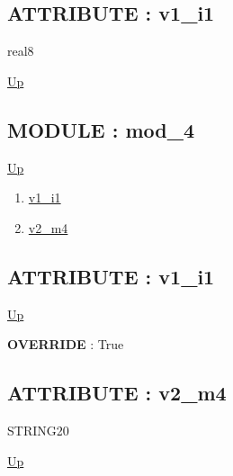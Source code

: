 \subsection*{ATTRIBUTE : v1\_i1}
\hypertarget{ecldoc:intest.example_2.iface_1.v1_i1}{}
\par
\begin{minipage}[t]{\textwidth}
\begin{flushleft}
real8  
\end{flushleft}
\end{minipage}
\hyperlink{ecldoc:intest.example_2.iface_1}{Up} \\
\par
\par

\subsection*{MODULE : mod\_4}
\hypertarget{ecldoc:intest.example_2.mod_4}{}
\par
\begin{minipage}[t]{\textwidth}
\begin{flushleft}
  
\end{flushleft}
\end{minipage}
\hyperlink{ecldoc:intest.example_2}{Up} \\
\par
\par
\begin{enumerate}
\item \hyperlink{ecldoc:intest.example_2.mod_4.v1_i1}{v1\_i1}
\item \hyperlink{ecldoc:intest.example_2.mod_4.v2_m4}{v2\_m4}
\end{enumerate}
\subsection*{ATTRIBUTE : v1\_i1}
\hypertarget{ecldoc:intest.example_2.mod_4.v1_i1}{}
\par
\begin{minipage}[t]{\textwidth}
\begin{flushleft}
  
\end{flushleft}
\end{minipage}
\hyperlink{ecldoc:intest.example_2.mod_4}{Up} \\
\par
\par
\textbf{OVERRIDE} : True \\
\subsection*{ATTRIBUTE : v2\_m4}
\hypertarget{ecldoc:intest.example_2.mod_4.v2_m4}{}
\par
\begin{minipage}[t]{\textwidth}
\begin{flushleft}
STRING20  
\end{flushleft}
\end{minipage}
\hyperlink{ecldoc:intest.example_2.mod_4}{Up} \\
\par
\par


